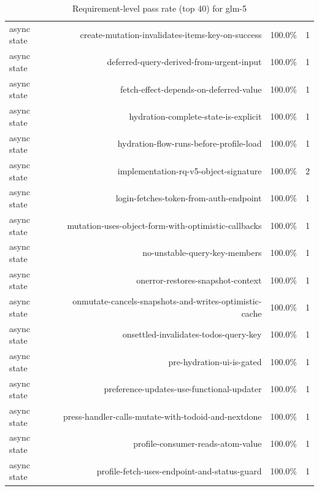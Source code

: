 \begin{table}[htbp]
\begin{tabular}{lrrr}
async state & create-mutation-invalidates-items-key-on-success & 100.0\% & 1 \\
async state & deferred-query-derived-from-urgent-input & 100.0\% & 1 \\
async state & fetch-effect-depends-on-deferred-value & 100.0\% & 1 \\
async state & hydration-complete-state-is-explicit & 100.0\% & 1 \\
async state & hydration-flow-runs-before-profile-load & 100.0\% & 1 \\
async state & implementation-rq-v5-object-signature & 100.0\% & 2 \\
async state & login-fetches-token-from-auth-endpoint & 100.0\% & 1 \\
async state & mutation-uses-object-form-with-optimistic-callbacks & 100.0\% & 1 \\
async state & no-unstable-query-key-members & 100.0\% & 1 \\
async state & onerror-restores-snapshot-context & 100.0\% & 1 \\
async state & onmutate-cancels-snapshots-and-writes-optimistic-cache & 100.0\% & 1 \\
async state & onsettled-invalidates-todos-query-key & 100.0\% & 1 \\
async state & pre-hydration-ui-is-gated & 100.0\% & 1 \\
async state & preference-updates-use-functional-updater & 100.0\% & 1 \\
async state & press-handler-calls-mutate-with-todoid-and-nextdone & 100.0\% & 1 \\
async state & profile-consumer-reads-atom-value & 100.0\% & 1 \\
async state & profile-fetch-uses-endpoint-and-status-guard & 100.0\% & 1 \\
\bottomrule
\end{tabular}
\caption{Requirement-level pass rate (top 40) for glm-5}
\end{table}
